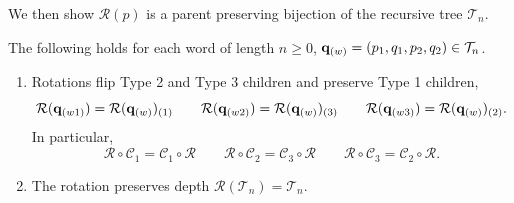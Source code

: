 \documentclass[12pt]{amsart}
\begin{document}
We then show $\mathcal{R}(p)$ is a parent preserving bijection of the recursive tree $\mathcal{T}_n$. 
\begin{lemma} \label{lemma:rot_invariance}
	The following holds for each word of length $n \geq 0$,   $\mathbf{q}_{(w)} = (p_1, q_1, p_2, q_2) \in \mathcal{T}_n$.
	\begin{enumerate}
		\item Rotations flip Type 2 and Type 3 children and preserve Type 1 children, 
		\[
		\mathcal{R}(\mathbf{q}_{(w1)}) =\mathcal{R}(\mathbf{q}_{(w)})_{(1)} \qquad 
		\mathcal{R}(\mathbf{q}_{(w2)}) =\mathcal{R}(\mathbf{q}_{(w)})_{(3)} \qquad
		\mathcal{R}(\mathbf{q}_{(w3)}) =\mathcal{R}(\mathbf{q}_{(w)})_{(2)}.
		\]
		In particular, 
		\[
		\mathcal{R} \circ \mathcal{C}_1 = \mathcal{C}_1 \circ \mathcal{R} \qquad 		\mathcal{R} \circ \mathcal{C}_2 = \mathcal{C}_3 \circ \mathcal{R} \qquad 		\mathcal{R} \circ \mathcal{C}_3 = \mathcal{C}_2 \circ \mathcal{R}.
		\]

		\item The rotation preserves depth  $\mathcal{R}(\mathcal{T}_n) = \mathcal{T}_n$.
		
	\end{enumerate}
	
	
	
\end{lemma}
\end{document}
